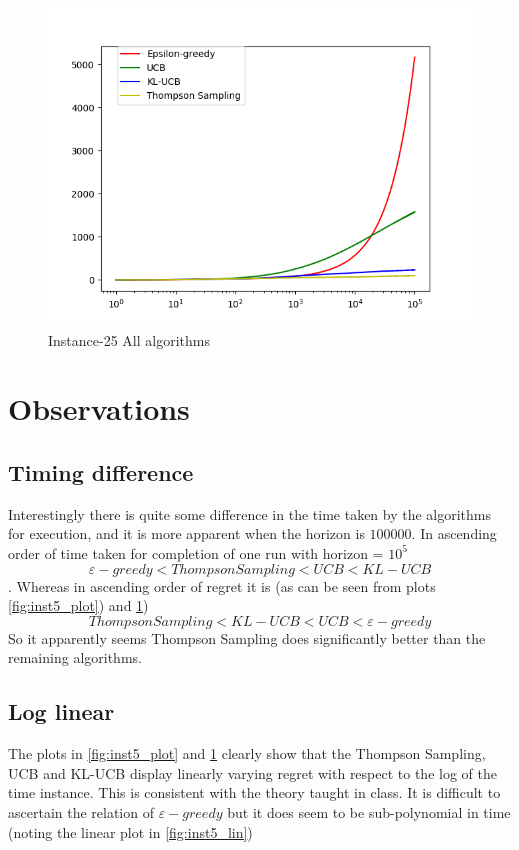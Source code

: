 \documentclass{article}
\begin{document}
\begin{figure}[H]
  \centering
  \includegraphics[scale=1]{images/Instance-25}
  \caption{Instance-25 All algorithms}
  \label{fig:inst25_plot}
\end{figure}

\section{Observations}
\subsection{Timing difference}
Interestingly there is quite some difference in the time taken by the algorithms for execution, and it is more apparent when the horizon is $100000$. In ascending order of time taken for completion of one run with horizon = $10^5$
$$\varepsilon - greedy < Thompson Sampling < UCB < KL-UCB$$.
Whereas in ascending order of regret it is (as can be seen from plots \ref{fig:inst5_plot}) and \ref{fig:inst25_plot})
$$Thompson Sampling < KL-UCB < UCB < \varepsilon - greedy$$
So it apparently seems Thompson Sampling does significantly better than the remaining algorithms.

\subsection{Log linear}
The plots in \ref{fig:inst5_plot} and \ref{fig:inst25_plot} clearly show that the Thompson Sampling, UCB and KL-UCB display linearly varying regret with respect to the log of the time instance. This is consistent with the theory taught in class. It is difficult to ascertain the relation of $\varepsilon - greedy$ but it does seem to be sub-polynomial in time (noting the linear plot in \ref{fig:inst5_lin})
\end{document}

